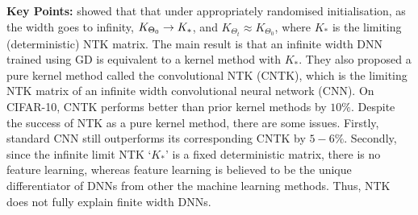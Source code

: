 \textbf{Key Points:} \citet{arora2019exact} showed that  that under appropriately randomised initialisation, as the width goes to infinity, $K_{\Theta_0}\rightarrow K_*$, and $K_{\Theta_t}\approx K_{\Theta_0}$, where $K_*$ is the limiting (deterministic) NTK matrix. The main result is that an infinite width DNN trained using GD is equivalent to a kernel method with $K_*$.  They also proposed a pure kernel method  called the convolutional NTK (CNTK), which is the limiting NTK matrix  of an infinite width convolutional neural network (CNN). On CIFAR-10, CNTK  performs better than prior kernel methods by $10\%$. Despite the success of NTK as a pure kernel method, there are some issues.  Firstly, standard CNN still outperforms its corresponding CNTK by $5-6\%$. Secondly, since the infinite limit NTK `$K_*$' is a fixed deterministic matrix, there is no feature learning, whereas feature learning is believed to be the unique differentiator of DNNs from other the machine learning methods. Thus, NTK does not fully explain finite width DNNs. 
